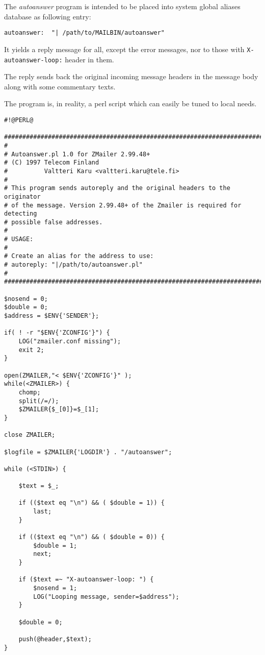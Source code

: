 The {\em autoanswer\/} program is intended to be placed into
system global aliases database as following entry:

\begin{verbatim}
autoanswer:  "| /path/to/MAILBIN/autoanswer"
\end{verbatim}


It yields a reply message for all, except the error messages, nor
to those with {\tt X-autoanswer-loop:} header in them.

The reply sends back the original incoming message headers in the
message body along with some commentary texts.

The program is, in reality, a perl script which can easily be tuned
to local needs.

\begin{verbatim}
#!@PERL@

##########################################################################
#
# Autoanswer.pl 1.0 for ZMailer 2.99.48+
# (C) 1997 Telecom Finland
#          Valtteri Karu <valtteri.karu@tele.fi>
# 
# This program sends autoreply and the original headers to the originator 
# of the message. Version 2.99.48+ of the Zmailer is required for detecting
# possible false addresses.
#
# USAGE:
#
# Create an alias for the address to use:
# autoreply: "|/path/to/autoanswer.pl"
#
##########################################################################

$nosend = 0;
$double = 0;
$address = $ENV{'SENDER'};

if( ! -r "$ENV{'ZCONFIG'}") {
    LOG("zmailer.conf missing");
    exit 2;
}

open(ZMAILER,"< $ENV{'ZCONFIG'}" );
while(<ZMAILER>) {
    chomp;
    split(/=/);
    $ZMAILER{$_[0]}=$_[1];
}

close ZMAILER;

$logfile = $ZMAILER{'LOGDIR'} . "/autoanswer";

while (<STDIN>) {

    $text = $_;

    if (($text eq "\n") && ( $double = 1)) {
        last;
    }

    if (($text eq "\n") && ( $double = 0)) {
        $double = 1;
        next;
    }
    
    if ($text =~ "X-autoanswer-loop: ") {
        $nosend = 1;
        LOG("Looping message, sender=$address");
    }

    $double = 0;

    push(@header,$text);
}


\end{verbatim}

